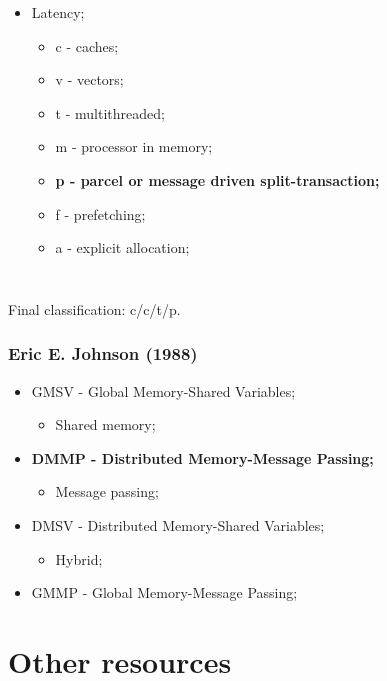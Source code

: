 \documentclass{beamer}
\begin{document}
\begin{frame}
\begin{columns}
    \begin{itemize}
      \item Latency;
            \begin{itemize}
              \item c - caches;
              \item v - vectors;
              \item t - multithreaded;
              \item m - processor in memory;
              \item \textbf{p - parcel or message driven split-transaction;}
              \item f - prefetching;
              \item a - explicit allocation;
            \end{itemize}
    \end{itemize}
  \end{columns}
  \bigbreak
  \bigbreak
  Final classification: c/c/t/p.
\end{frame}

\begin{frame}
  \frametitle{Eric E. Johnson (1988)}
  \begin{itemize}
    \item GMSV - Global Memory-Shared Variables;
          \begin{itemize}
            \item Shared memory;
          \end{itemize}
    \item \textbf{DMMP - Distributed Memory-Message Passing;}
          \begin{itemize}
            \item Message passing;
          \end{itemize}
    \item DMSV - Distributed Memory-Shared Variables;
          \begin{itemize}
            \item Hybrid;
          \end{itemize}
    \item GMMP - Global Memory-Message Passing;
  \end{itemize}
\end{frame}


\section{Other resources}
\end{document}
